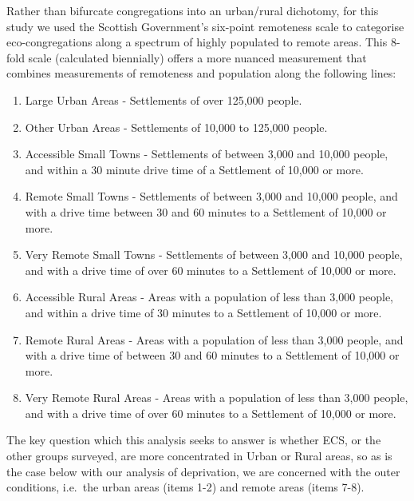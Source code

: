 \documentclass[11pt,]{article}
\providecommand{\tightlist}{%
  \setlength{\itemsep}{0pt}\setlength{\parskip}{0pt}}
\begin{document}
Rather than bifurcate congregations into an urban/rural dichotomy, for
this study we used the Scottish Government's six-point remoteness scale
to categorise eco-congregations along a spectrum of highly populated to
remote areas. This 8-fold scale (calculated biennially) offers a more
nuanced measurement that combines measurements of remoteness and
population along the following lines:

\begin{enumerate}
\def\labelenumi{\arabic{enumi}.}
\tightlist
\item
  Large Urban Areas - Settlements of over 125,000 people.
\item
  Other Urban Areas - Settlements of 10,000 to 125,000 people.
\item
  Accessible Small Towns - Settlements of between 3,000 and 10,000
  people, and within a 30 minute drive time of a Settlement of 10,000 or
  more.
\item
  Remote Small Towns - Settlements of between 3,000 and 10,000 people,
  and with a drive time between 30 and 60 minutes to a Settlement of
  10,000 or more.
\item
  Very Remote Small Towns - Settlements of between 3,000 and 10,000
  people, and with a drive time of over 60 minutes to a Settlement of
  10,000 or more.
\item
  Accessible Rural Areas - Areas with a population of less than 3,000
  people, and within a drive time of 30 minutes to a Settlement of
  10,000 or more.
\item
  Remote Rural Areas - Areas with a population of less than 3,000
  people, and with a drive time of between 30 and 60 minutes to a
  Settlement of 10,000 or more.
\item
  Very Remote Rural Areas - Areas with a population of less than 3,000
  people, and with a drive time of over 60 minutes to a Settlement of
  10,000 or more.
\end{enumerate}

The key question which this analysis seeks to answer is whether ECS, or
the other groups surveyed, are more concentrated in Urban or Rural
areas, so as is the case below with our analysis of deprivation, we are
concerned with the outer conditions, i.e.~the urban areas (items 1-2)
and remote areas (items 7-8).
\end{document}
